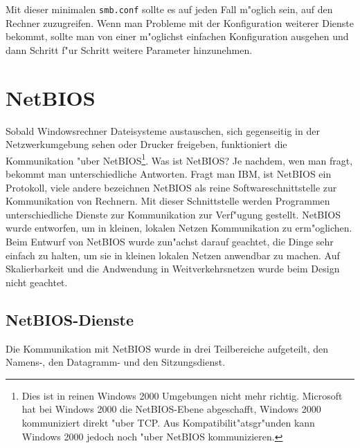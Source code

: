 \documentclass{scrartcl}\usepackage{pslatex}\typearea{12}
\newcommand{\dateistyle}{\texttt}
\begin{document}
Mit dieser minimalen \dateistyle{smb.conf} sollte es auf jeden Fall
m"oglich sein, auf den Rechner zuzugreifen. Wenn man Probleme mit der
Konfiguration weiterer Dienste bekommt, sollte man von einer
m"oglichst einfachen Konfiguration ausgehen und dann Schritt f"ur
Schritt weitere Parameter hinzunehmen.



\section{NetBIOS}

Sobald Windowsrechner Dateisysteme austauschen, sich gegenseitig in
der Netzwerkumgebung sehen oder Drucker freigeben, funktioniert die
Kommunikation "uber NetBIOS\footnote{Dies ist in reinen Windows 2000
  Umgebungen nicht mehr richtig. Microsoft hat bei Windows 2000 die
  NetBIOS-Ebene abgeschafft, Windows 2000 kommuniziert direkt "uber
  TCP. Aus Kompatibilit"atsgr"unden kann Windows 2000 jedoch noch
  "uber NetBIOS kommunizieren.}. Was ist NetBIOS? Je nachdem, wen man
fragt, bekommt man unterschiedliche Antworten. Fragt man IBM, ist
NetBIOS ein Protokoll, viele andere bezeichnen NetBIOS als reine
Softwareschnittstelle zur Kommunikation von Rechnern. Mit dieser
Schnittstelle werden Programmen unterschiedliche Dienste zur
Kommunikation zur Verf"ugung gestellt. NetBIOS wurde entworfen, um in
kleinen, lokalen Netzen Kommunikation zu erm"oglichen. Beim Entwurf
von NetBIOS wurde zun"achst darauf geachtet, die Dinge sehr einfach zu
halten, um sie in kleinen lokalen Netzen anwendbar zu machen. Auf
Skalierbarkeit und die Andwendung in Weitverkehrsnetzen wurde beim
Design nicht geachtet.

\subsection{NetBIOS-Dienste}

Die Kommunikation mit NetBIOS wurde in drei Teilbereiche aufgeteilt,
den Namens-, den Datagramm- und den Sitzungsdienst.
\end{document}
